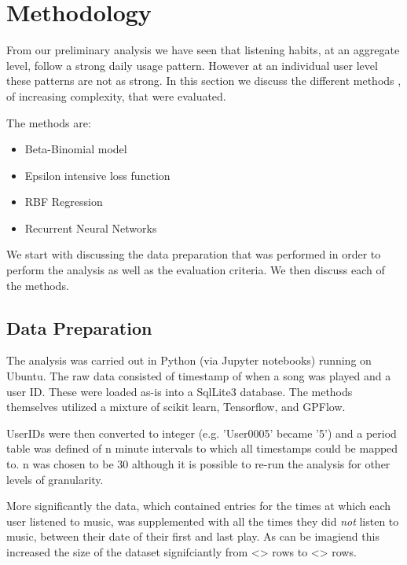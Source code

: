 
\chapter{Methodology} %

\label{Chapter4} %

From our preliminary analysis we have seen that listening habits, at an aggregate level, follow a strong daily usage pattern. However at an individual user level these patterns are not as strong. In this section we discuss the different methods , of increasing complexity, that were evaluated.

The methods are:

\begin{itemize}
	\item Beta-Binomial model
	\item Epsilon intensive loss function
	\item RBF Regression
	\item Recurrent Neural Networks
\end{itemize}

We start with discussing the data preparation that was performed in order to perform the analysis as well as the evaluation criteria. We then discuss each of the methods.

\section{Data Preparation}

The analysis was carried out in Python (via Jupyter notebooks) running on Ubuntu. The raw data consisted of timestamp of when a song was played and a user ID. These were loaded as-is into a SqlLite3 database. The methods themselves utilized a mixture of scikit learn, Tensorflow, and GPFlow.

UserIDs were then converted to integer (e.g. 'User0005' became '5') and a period table was defined of n minute intervals to which all timestamps could be mapped to. n was chosen to be 30 although it is possible to re-run the analysis for other levels of granularity.

More significantly the data, which contained entries for the times at which each user listened to music, was supplemented with all the times they did \emph{not} listen to music, between their date of their first and last play. As can be imagiend this increased the size of the dataset signifciantly from <> rows to <> rows.

